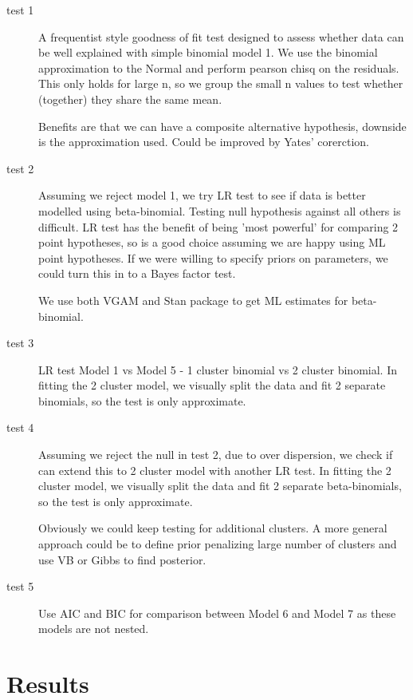 \documentclass[11pt,a4,singlespacing,titlepagenumber=on]{scrreprt}
\numberwithin{equation}{chapter} %
\theoremstyle{remark}
\begin{document}
\begin{description}
	\item[test 1] A frequentist style goodness of fit test designed to assess whether data can be well explained with simple binomial model 1. We use the binomial approximation to the Normal and perform pearson chisq on the residuals. This only holds for large n, so we group the small n values to test whether (together) they share the same mean.

Benefits are that we can have a composite alternative hypothesis, downside is the approximation used. Could be improved by Yates' corerction. 


	\item[test 2] Assuming we reject model 1, we try LR test to see if data is better modelled using beta-binomial. Testing null hypothesis against all others is difficult. LR test has the benefit of being 'most powerful' for comparing 2 point hypotheses, so is a good choice assuming we are happy using ML point hypotheses. If we were willing to specify priors on parameters, we could turn this in to a Bayes factor test.


We use both VGAM and Stan package to get ML estimates for beta-binomial.

	\item[test 3] LR test Model 1 vs Model 5 - 1 cluster binomial vs 2 cluster binomial. In fitting the 2 cluster model, we visually split the data and fit 2 separate binomials, so the test is only approximate. 


	\item[test 4] Assuming we reject the null in test 2, due to over dispersion, we check if can extend this to 2 cluster model with another LR test. In fitting the 2 cluster model, we visually split the data and fit 2 separate beta-binomials, so the test is only approximate. 

Obviously we could keep testing for additional clusters. A more general approach could be to define prior penalizing large number of clusters and use VB or Gibbs to find posterior.

	\item[test 5] Use AIC and BIC for comparison between Model 6 and Model 7 as these models are not nested.
\end{description}

\section{Results}
\end{document}
